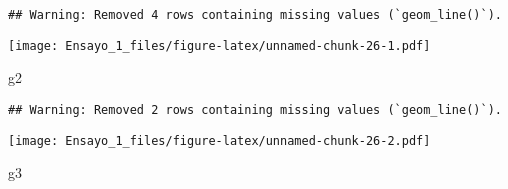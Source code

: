 \documentclass[
]{article}
\newenvironment{Shaded}{\begin{snugshade}}{\end{snugshade}}
\newcommand{\AttributeTok}[1]{\textcolor[rgb]{0.77,0.63,0.00}{#1}}
\newcommand{\FunctionTok}[1]{\textcolor[rgb]{0.00,0.00,0.00}{#1}}
\newcommand{\NormalTok}[1]{#1}
\newcommand{\OtherTok}[1]{\textcolor[rgb]{0.56,0.35,0.01}{#1}}
\newcommand{\SpecialCharTok}[1]{\textcolor[rgb]{0.00,0.00,0.00}{#1}}
\newcommand{\StringTok}[1]{\textcolor[rgb]{0.31,0.60,0.02}{#1}}
\begin{document}
\begin{Shaded}
\end{Shaded}

\begin{verbatim}
## Warning: Removed 4 rows containing missing values (`geom_line()`).
\end{verbatim}

\texttt{[image: Ensayo\_1\_files/figure-latex/unnamed-chunk-26-1.pdf]}

\begin{Shaded}
\begin{Highlighting}[]
\NormalTok{g2}
\end{Highlighting}
\end{Shaded}

\begin{verbatim}
## Warning: Removed 2 rows containing missing values (`geom_line()`).
\end{verbatim}

\texttt{[image: Ensayo\_1\_files/figure-latex/unnamed-chunk-26-2.pdf]}

\begin{Shaded}
\begin{Highlighting}[]
\NormalTok{g3}
\end{Highlighting}
\end{Shaded}
\end{document}
